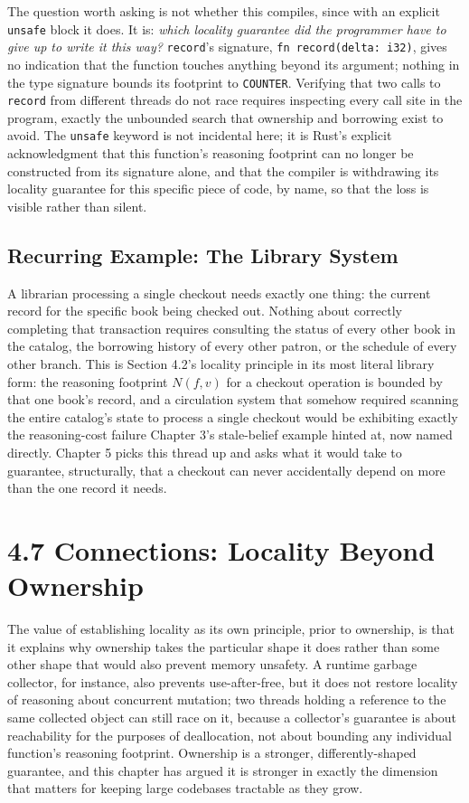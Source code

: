 \documentclass[11pt]{book}
\begin{document}
The question worth asking is not whether this compiles, since with an explicit \texttt{unsafe} block it does. It is: \emph{which locality guarantee did the programmer have to give up to write it this way?} \texttt{record}'s signature, \texttt{fn record(delta: i32)}, gives no indication that the function touches anything beyond its argument; nothing in the type signature bounds its footprint to \texttt{COUNTER}. Verifying that two calls to \texttt{record} from different threads do not race requires inspecting every call site in the program, exactly the unbounded search that ownership and borrowing exist to avoid. The \texttt{unsafe} keyword is not incidental here; it is Rust's explicit acknowledgment that this function's reasoning footprint can no longer be constructed from its signature alone, and that the compiler is withdrawing its locality guarantee for this specific piece of code, by name, so that the loss is visible rather than silent.

\subsection*{Recurring Example: The Library System}

A librarian processing a single checkout needs exactly one thing: the current record for the specific book being checked out. Nothing about correctly completing that transaction requires consulting the status of every other book in the catalog, the borrowing history of every other patron, or the schedule of every other branch. This is Section 4.2's locality principle in its most literal library form: the reasoning footprint $N(f, v)$ for a checkout operation is bounded by that one book's record, and a circulation system that somehow required scanning the entire catalog's state to process a single checkout would be exhibiting exactly the reasoning-cost failure Chapter 3's stale-belief example hinted at, now named directly. Chapter 5 picks this thread up and asks what it would take to guarantee, structurally, that a checkout can never accidentally depend on more than the one record it needs.

\section*{4.7 Connections: Locality Beyond Ownership}

The value of establishing locality as its own principle, prior to ownership, is that it explains why ownership takes the particular shape it does rather than some other shape that would also prevent memory unsafety. A runtime garbage collector, for instance, also prevents use-after-free, but it does not restore locality of reasoning about concurrent mutation; two threads holding a reference to the same collected object can still race on it, because a collector's guarantee is about reachability for the purposes of deallocation, not about bounding any individual function's reasoning footprint. Ownership is a stronger, differently-shaped guarantee, and this chapter has argued it is stronger in exactly the dimension that matters for keeping large codebases tractable as they grow.
\end{document}
